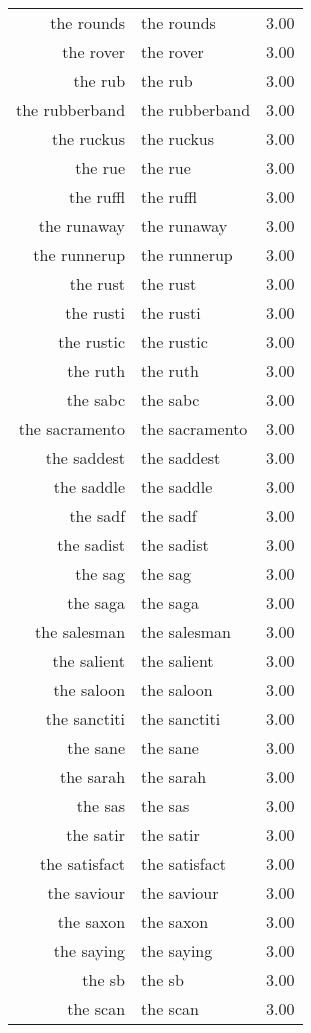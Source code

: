 \begin{table}[ht]
\begin{tabular}{rlr}
  the rounds & the rounds & 3.00 \\ 
  the rover & the rover & 3.00 \\ 
  the rub & the rub & 3.00 \\ 
  the rubberband & the rubberband & 3.00 \\ 
  the ruckus & the ruckus & 3.00 \\ 
  the rue & the rue & 3.00 \\ 
  the ruffl & the ruffl & 3.00 \\ 
  the runaway & the runaway & 3.00 \\ 
  the runnerup & the runnerup & 3.00 \\ 
  the rust & the rust & 3.00 \\ 
  the rusti & the rusti & 3.00 \\ 
  the rustic & the rustic & 3.00 \\ 
  the ruth & the ruth & 3.00 \\ 
  the sabc & the sabc & 3.00 \\ 
  the sacramento & the sacramento & 3.00 \\ 
  the saddest & the saddest & 3.00 \\ 
  the saddle & the saddle & 3.00 \\ 
  the sadf & the sadf & 3.00 \\ 
  the sadist & the sadist & 3.00 \\ 
  the sag & the sag & 3.00 \\ 
  the saga & the saga & 3.00 \\ 
  the salesman & the salesman & 3.00 \\ 
  the salient & the salient & 3.00 \\ 
  the saloon & the saloon & 3.00 \\ 
  the sanctiti & the sanctiti & 3.00 \\ 
  the sane & the sane & 3.00 \\ 
  the sarah & the sarah & 3.00 \\ 
  the sas & the sas & 3.00 \\ 
  the satir & the satir & 3.00 \\ 
  the satisfact & the satisfact & 3.00 \\ 
  the saviour & the saviour & 3.00 \\ 
  the saxon & the saxon & 3.00 \\ 
  the saying & the saying & 3.00 \\ 
  the sb & the sb & 3.00 \\ 
  the scan & the scan & 3.00 \\ 

\end{tabular}
\end{table}
